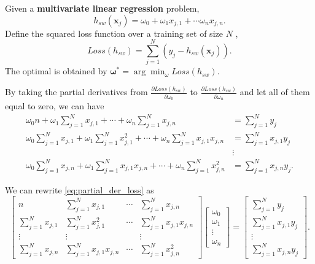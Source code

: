 \documentclass[10pt,a4paper]{article}
\begin{document}
Given a \textbf{multivariate linear regression} problem,
\begin{equation}
h_{sw} (\mathbf{x}_{j}) = \omega_{0} + \omega_{1} x_{j,1} + \cdots \omega_{n} x_{j,n}.
\end{equation}
Define the squared loss function over a training set of size $ N $ ,
\begin{equation}
Loss(h_{sw}) = \sum_{j=1}^{N} ( y_{j} - h_{sw} (\mathbf{x}_{j}) ).
\end{equation}
The optimal is obtained by $ \boldsymbol{\omega}^{*} = \arg \min_{\mathbb{\omega}} Loss(h_{sw}) $.

By taking the partial derivatives from $ \frac{\partial Loss(h_{sw}) }{\partial \omega_{0}} $ to $ \frac{\partial Loss(h_{sw}) }{\partial \omega_{n}} $ and let all of them equal to zero, we can have
\begin{equation}
\label{eq:partial_der_loss}
\begin{aligned}
\omega_{0} n + \omega_{1} \sum_{j=1}^{N} x_{j,1} + \cdots + \omega_{n} \sum_{j=1}^{N} x_{j,n} & = \sum_{j=1}^{N} y_{j} \\
\omega_{0} \sum_{j=1}^{N} x_{j,1} + \omega_{1} \sum_{j=1}^{N} x_{j,1}^{2} + \cdots + \omega_{n} \sum_{j=1}^{N} x_{j,1} x_{j,n} & =  \sum_{j=1}^{N} x_{j,1} y_{j} \\
& \vdots \\
\omega_{0} \sum_{j=1}^{N} x_{j,n} + \omega_{1} \sum_{j=1}^{N} x_{j,1} x_{j,n} + \cdots + \omega_{n} \sum_{j=1}^{N} x_{j,n}^{2} & =  \sum_{j=1}^{N} x_{j,n} y_{j}.
\end{aligned}
\end{equation}

We can rewrite \eqref{eq:partial_der_loss} as
\begin{equation}
\label{eq:partial_der_loss:matrix}
\begin{bmatrix}
n & \sum_{j=1}^{N} x_{j,1} & \cdots & \sum_{j=1}^{N} x_{j,n} \\ 
\sum_{j=1}^{N} x_{j,1} &  \sum_{j=1}^{N} x_{j,1}^{2} & \cdots & \sum_{j=1}^{N} x_{j,1} x_{j,n} \\
\vdots & \vdots & & \vdots \\
\sum_{j=1}^{N} x_{j,n} &  \sum_{j=1}^{N} x_{j,1} x_{j,n} & \cdots & \sum_{j=1}^{N} x_{j,n}^{2}
\end{bmatrix}
\begin{bmatrix}
\omega_{0} \\ 
\omega_{1} \\
\vdots \\
\omega_{n}  
\end{bmatrix}
=
\begin{bmatrix}
\sum_{j=1}^{N} y_{j} \\ 
\sum_{j=1}^{N} x_{j,1} y_{j} \\
\vdots \\
\sum_{j=1}^{N} x_{j,n} y_{j} 
\end{bmatrix}.
\end{equation}
\end{document}
